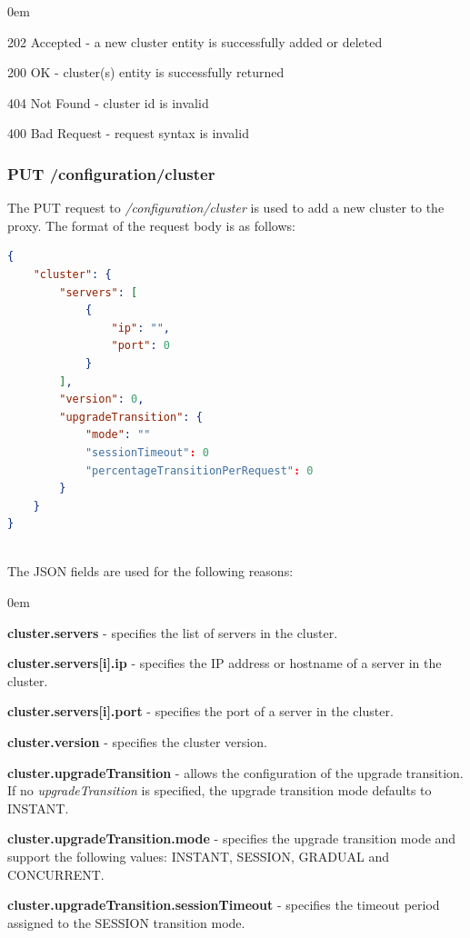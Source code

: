 \documentclass[a4paper,11pt,twoside]{article}
\begin{document}
\begin{list}{-}{}
  \itemsep0em
  \item{202 Accepted}  -  a new cluster entity is successfully added or deleted
  
  \item{200 OK} -  cluster(s) entity is successfully returned
  
   \item{404 Not Found} - cluster id is invalid
   
    \item{400 Bad Request } - request syntax is invalid
  
\end{list}

\subsubsection{PUT /configuration/cluster}
The PUT request to \textit{/configuration/cluster}  is used to add a new cluster to the proxy. The format of the request body is as follows:\\

\begin{lstlisting}[language=json,firstnumber=1]
{
    "cluster": {
        "servers": [
            {
                "ip": "", 
                "port": 0
            }
        ], 
        "version": 0, 
        "upgradeTransition": {
            "mode": ""
            "sessionTimeout": 0  
            "percentageTransitionPerRequest": 0 
        }
    }
}
\end{lstlisting}

\noindent\\
The JSON fields are used for the following reasons:

\begin{list}{-}{}
  \itemsep0em
  \item\textbf{{cluster.servers}} - specifies the list of servers in the cluster.
  
  \item\textbf{{cluster.servers[i].ip}} - specifies the IP address or hostname of a server in the cluster.
  
  \item\textbf{{cluster.servers[i].port}} - specifies the port of a server in the cluster.
  
  \item\textbf{{cluster.version}} - specifies the cluster version. 
  
  \item\textbf{{cluster.upgradeTransition}} - allows the configuration of the upgrade transition. If no \textit{upgradeTransition} is specified, the upgrade transition mode defaults to INSTANT.  
  
  \item\textbf{{cluster.upgradeTransition.mode}} - specifies the upgrade transition mode and support the following values: INSTANT, SESSION, GRADUAL and CONCURRENT.
   
  \item\textbf{{cluster.upgradeTransition.sessionTimeout}} - specifies the timeout period assigned to the SESSION transition mode. 
\end{list}
\end{document}
